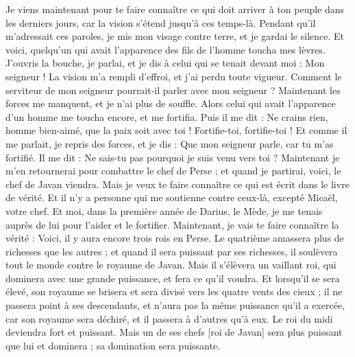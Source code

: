 \begin{multicols}{2}
Je viens maintenant pour te faire connaître ce qui doit arriver à ton peuple dans les derniers jours, car la vision s’étend jusqu’à ces temps-là.
Pendant qu’il m’adressait ces paroles, je mis mon visage contre terre, et je gardai le silence.
Et voici, quelqu'un qui avait l’apparence des fils de l’homme toucha mes lèvres.  J’ouvris la bouche, je parlai, et je dis à celui qui se tenait devant moi : Mon seigneur ! La vision m’a rempli d’effroi, et j’ai perdu toute vigueur.
Comment le serviteur de mon seigneur pourrait-il parler avec mon seigneur ? Maintenant les forces me manquent, et je n’ai plus de souffle.
Alors celui qui avait l’apparence d’un homme me toucha encore, et me fortifia.
Puis il me dit : Ne crains rien, homme bien-aimé, que la paix soit avec toi ! Fortifie-toi, fortifie-toi ! Et comme il me parlait, je repris des forces, et je dis : Que mon seigneur parle, car tu m'as fortifié.
Il me dit : Ne sais-tu pas pourquoi je suis venu vers toi ? Maintenant je m'en retournerai pour combattre le chef de Perse ; et quand je partirai, voici, le chef de Javan viendra.
Mais je veux te faire connaître ce qui est écrit dans le livre de vérité. Et il n'y a personne qui me soutienne contre ceux-là, excepté Micaël, votre chef.
\VerseOne{}Et moi, dans la première année de Darius, le Mède, je me tenais auprès de lui pour l’aider et le fortifier.
Maintenant, je vais te faire connaître la vérité : Voici, il y aura encore trois rois en Perse. Le quatrième amassera plus de richesses que les autres ; et quand il sera puissant par ses richesses, il soulèvera tout le monde contre le royaume de Javan.
Mais il s’élèvera un vaillant roi, qui dominera avec une grande puissance, et fera ce qu’il voudra.
Et lorsqu’il se sera élevé, son royaume se brisera et sera  divisé vers les quatre vents des cieux ; il ne passera point à ses descendants, et n’aura pas la même puissance qu’il a exercée, car son royaume sera déchiré, et il passera à d'autres qu’à eux.
Le roi du midi deviendra fort et puissant.  Mais un de ses chefs [roi de Javan] sera plus puissant que lui et dominera ; sa domination sera puissante.

\end{multicols}
